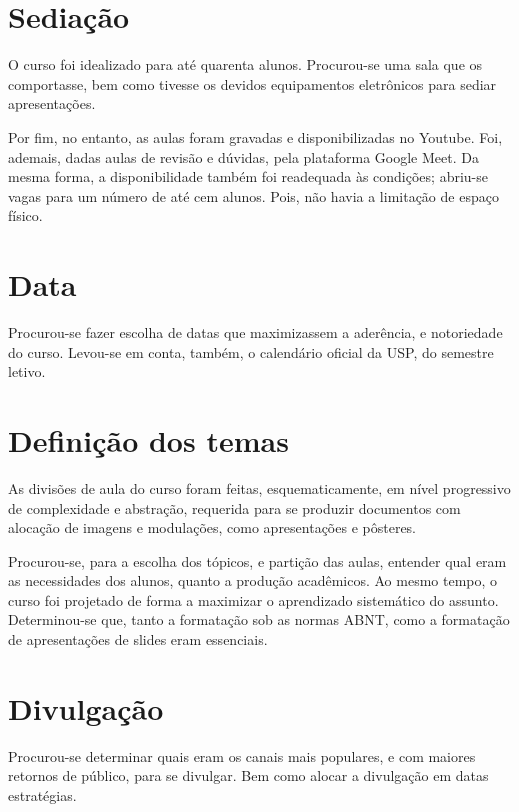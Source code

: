 \documentclass[
12pt,				%
openright,			%
oneside,			%
a4paper,			%
english,			%
french,				%
spanish,			%
brazil,				%
]{abntex2}
\begin{document}
\section{Sediação}
O curso foi idealizado para até quarenta alunos. Procurou-se uma sala
que os comportasse, bem como tivesse os devidos equipamentos
eletrônicos para sediar apresentações.

Por fim, no entanto, as aulas foram gravadas e disponibilizadas no
Youtube. Foi, ademais, dadas aulas de revisão e dúvidas, pela
plataforma Google Meet. Da mesma forma, a disponibilidade também foi
readequada às condições; abriu-se vagas para um número de até cem
alunos. Pois, não havia a limitação de espaço físico.

\section{Data}
Procurou-se fazer escolha de datas que maximizassem a aderência, e
notoriedade do curso. Levou-se em conta, também, o calendário oficial
da USP, do semestre letivo.

\section{Definição dos temas}

As divisões de aula do curso foram feitas, esquematicamente, em nível
progressivo de complexidade e abstração, requerida para se produzir
documentos com alocação de imagens e modulações, como apresentações e pôsteres.

Procurou-se, para a escolha dos tópicos, e partição das aulas,
entender qual eram as necessidades dos alunos, quanto a produção
acadêmicos. Ao mesmo tempo, o curso foi projetado de forma a maximizar o
aprendizado sistemático do assunto.  Determinou-se que, tanto a
formatação sob as normas ABNT, como a formatação de apresentações de slides eram essenciais.

\section{Divulgação}

Procurou-se determinar quais eram os canais mais populares, e com
maiores retornos de público, para se divulgar. Bem como alocar a
divulgação em datas estratégias.

\end{document}
